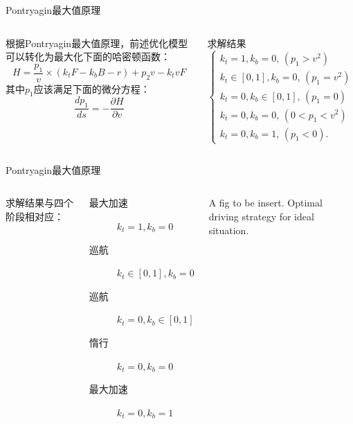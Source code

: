 \documentclass{beamer}
\begin{document}
\begin{frame}{Pontryagin最大值原理}
\begin{columns}[c]
    \column{6.5cm}
        根据Pontryagin最大值原理，前述优化模型可以转化为最大化下面的哈密顿函数：
        \begin{equation*}
          H = \frac{p_1}{v} \times (k_t F - k_b B - r) + p_2 v - k_t v F
        \end{equation*}
        其中$p_1$应该满足下面的微分方程：
        \begin{equation*}
          \frac{dp_1}{ds} = - \frac{\partial H}{\partial v}
        \end{equation*}
    \column{5.5cm}
    \begin{block}{求解结果}
    \begin{equation*}
      \left\{
        \begin{array}{l}
        k_t = 1, k_b = 0, \, (p_1>v^2) \\
        k_t \in [0,1], k_b = 0, \, (p_1 = v^2) \\
        k_t = 0, k_b \in [0,1], \, (p_1 = 0) \\
        k_t = 0, k_b = 0, \, (0 < p_1 < v^2) \\
        k_t = 0, k_b = 1, \, (p_1 < 0).
        \end{array}
      \right.
    \end{equation*}
    \end{block}
\end{columns}
\end{frame}

\begin{frame}{Pontryagin最大值原理}
\begin{columns}[c]
\column{6cm}
求解结果与四个阶段相对应：
\begin{description}
  \item[最大加速] $k_t = 1, k_b = 0$
  \item[巡航] $k_t \in [0,1], k_b = 0$
  \item[巡航] $k_t = 0, k_b \in [0,1]$
  \item[惰行] $k_t = 0, k_b = 0$
  \item[最大加速] $k_t = 0, k_b = 1$
\end{description}

\column{5cm} A fig to be insert. Optimal driving strategy for ideal situation.
\end{columns}
\end{frame}
\end{document}
